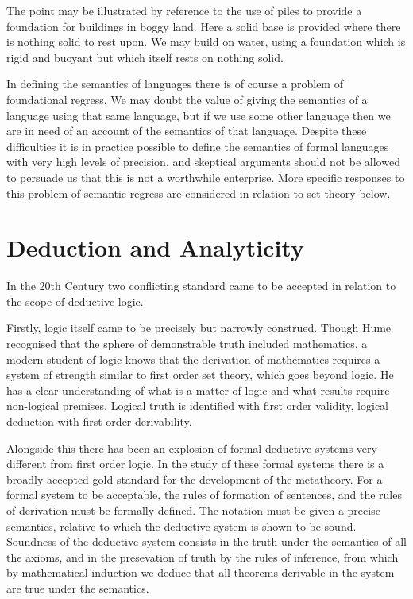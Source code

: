 \documentclass{rbjk}
\begin{document}
\begin{article}
The point may be illustrated by reference to the use of piles to provide a foundation for buildings in boggy land.
Here a solid base is provided where there is nothing solid to rest upon.
We may build on water, using a foundation which is rigid and buoyant but which itself rests on nothing solid.

In defining the semantics of languages there is of course a problem of foundational regress.
We may doubt the value of giving the semantics of a language using that same language, but if we use some other language then we are in need of an account of the semantics of that language.
Despite these difficulties it is in practice possible to define the semantics of formal languages with very high levels of precision, and skeptical arguments should not be allowed to persuade us that this  is not a worthwhile enterprise.
More specific responses to this problem of semantic regress are considered in relation to set theory below.

\section{Deduction and Analyticity}

In the 20th Century two conflicting standard came to be accepted in relation to the scope of deductive logic.

Firstly, logic itself came to be precisely but narrowly construed.
Though Hume recognised that the sphere of demonstrable truth included mathematics, a modern student of logic knows that the derivation of mathematics requires a system of strength similar to first order set theory, which goes beyond logic.
He has a clear understanding of what is a matter of logic and what results require non-logical premises.
Logical truth is identified with first order validity, logical deduction with first order derivability.

Alongside this there has been an explosion of formal deductive systems very different from first order logic.
In the study of these formal systems there is a broadly accepted gold standard for the development of the metatheory.
For a formal system to be acceptable, the rules of formation of sentences, and the rules of derivation must be formally defined.
The notation must be given a precise semantics, relative to which the deductive system is shown to be sound.
Soundness of the deductive system consists in the truth under the semantics of all the axioms, and in the presevation of truth by the rules of inference, from which by mathematical induction we deduce that all theorems derivable in the system are true under the semantics.


\end{article}
\end{document}
